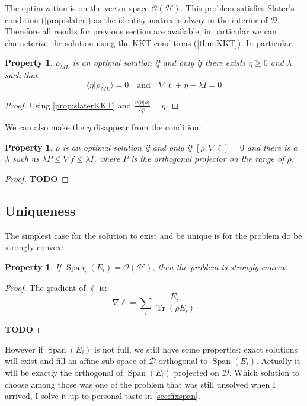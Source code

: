 \documentclass[10pt]{report}
\theoremstyle{plain}
\newtheorem{prop}[thm]{Property}
\theoremstyle{definition}
\theoremstyle{remark}
\newcommand{\TODO}{\textbf{TODO}}
\newcommand{\braket}[2]{\langle#1|#2\rangle}
\newcommand{\dpar}[2]{\frac{\partial{#1}}{\partial{#2}}}
\DeclareMathOperator{\Tr}{Tr}
\DeclareMathOperator{\Span}{Span}
\newcommand{\ml}{_{M\!L}}
\begin{document}
The optimization is on the vector space $\mathcal{O}(\mathcal{H})$. This problem
satisfies Slater's condition (\ref{prop:slater}) as the identity matrix is alway
in the interior of $\mathcal{D}$. Therefore all results for previous section are
available, in particular we can characterize the solution using the KKT
conditions (\ref{thm:KKT}). In particular:

\begin{prop}
  $\rho\ml$ is an optimal solution if and only if there
exists $\eta \ge 0$ and $\lambda$ such that
\[\braket \eta {\rho\ml} = 0 \quad \text{and} \quad \nabla \ell + \eta +
  \lambda I = 0\]
\end{prop}

\begin{proof}
  Using \cref{prop:slaterKKT} and $\displaystyle\dpar{\braket \eta \rho}\rho = \eta$.
\end{proof}


We can also make the $\eta$ disappear from the condition:
\begin{prop}
  $\rho$ is an optimal solution if and only if $[\rho, \nabla \ell] = 0$ and
  there is a $\lambda$ such as $\lambda P \le \nabla f \le \lambda I$, where $P$
  is the orthogonal projector on the range of $\rho$.
\end{prop}

\begin{proof}
  \TODO{}
\end{proof}

\subsection{Uniqueness}

The simplest case for the solution to exist and be unique is for the problem do
be strongly convex:

\begin{prop}
  If $\Span_i(E_i) = \mathcal{O}(\mathcal{H})$, then the problem is strongly convex.
\end{prop}

\begin{proof}
The gradient of $\ell$ is:
\begin{equation}
\nabla \ell = \sum_i \frac{E_i}{\Tr(\rho E_i)}
\end{equation}

  \TODO{}
\end{proof}

However if $\Span(E_i)$ is not full, we still have some properties: exact
solutions will exist and fill an affine sub-space of $\mathcal{D}$ orthogonal to
$\Span(E_i)$. Actually it will be exactly the orthogonal of $\Span(E_i)$
projected on $\mathcal{D}$. Which solution to choose among those was one of the problem that
was still unsolved when I arrived, I solve it up to personal taste in \cref{sec:fixspan}.
\end{document}
